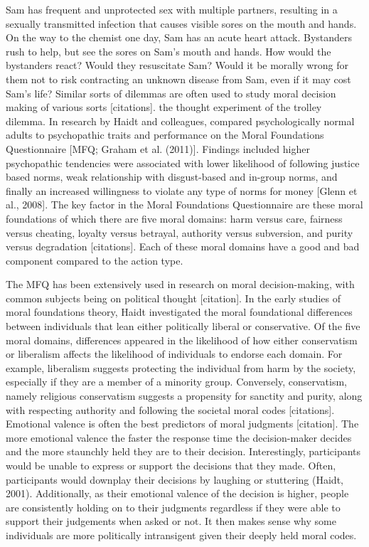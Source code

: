 \documentclass[
  english,
  donotrepeattitle,doc, 12pt, a4paper,floatsintext]{apa7}
\begin{document}
Sam has frequent and unprotected sex with multiple partners, resulting in a sexually transmitted infection that causes visible sores on the mouth and hands. On the way to the chemist one day, Sam has an acute heart attack. Bystanders rush to help, but see the sores on Sam's mouth and hands. How would the bystanders react? Would they resuscitate Sam? Would it be morally wrong for them not to risk contracting an unknown disease from Sam, even if it may cost Sam's life? Similar sorts of dilemmas are often used to study moral decision making of various sorts {[}citations{]}. the thought experiment of the trolley dilemma. In research by Haidt and colleagues, compared psychologically normal adults to psychopathic traits and performance on the Moral Foundations Questionnaire {[}MFQ; Graham et al. (2011){]}. Findings included higher psychopathic tendencies were associated with lower likelihood of following justice based norms, weak relationship with disgust-based and in-group norms, and finally an increased willingness to violate any type of norms for money {[}Glenn et al., 2008{]}. The key factor in the Moral Foundations Questionnaire are these moral foundations of which there are five moral domains: harm versus care, fairness versus cheating, loyalty versus betrayal, authority versus subversion, and purity versus degradation {[}citations{]}. Each of these moral domains have a good and bad component compared to the action type.

The MFQ has been extensively used in research on moral decision-making, with common subjects being on political thought {[}citation{]}. In the early studies of moral foundations theory, Haidt investigated the moral foundational differences between individuals that lean either politically liberal or conservative. Of the five moral domains, differences appeared in the likelihood of how either conservatism or liberalism affects the likelihood of individuals to endorse each domain. For example, liberalism suggests protecting the individual from harm by the society, especially if they are a member of a minority group. Conversely, conservatism, namely religious conservatism suggests a propensity for sanctity and purity, along with respecting authority and following the societal moral codes {[}citations{]}. Emotional valence is often the best predictors of moral judgments {[}citation{]}. The more emotional valence the faster the response time the decision-maker decides and the more staunchly held they are to their decision. Interestingly, participants would be unable to express or support the decisions that they made. Often, participants would downplay their decisions by laughing or stuttering (Haidt, 2001). Additionally, as their emotional valence of the decision is higher, people are consistently holding on to their judgments regardless if they were able to support their judgements when asked or not. It then makes sense why some individuals are more politically intransigent given their deeply held moral codes.
\end{document}
